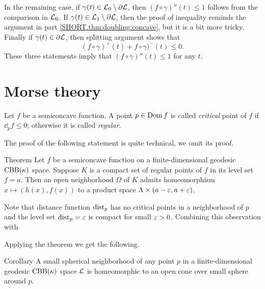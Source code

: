 In the remaining case, if $\gamma(t)\z\in \spc{L}_0\setminus\partial\spc{L}$, then $(f\circ\gamma)''(t)\le 1$ follows from the comparison in $\mathcal{L}_0$.
If $\gamma(t)\in \mathcal{L}_1\setminus\partial\mathcal{L}$, then the proof of inequality reminds the argument in part \ref{SHORT.thm:doubling:concave}, but it is a bit more tricky.
Finally if $\gamma(t)\in\partial\mathcal{L}$, then splitting argument shows that 
\[(f\circ\gamma)^+(t)+f\circ\gamma)^-(t)\le 0.\]
These three statements imply that $(f\circ\gamma)''(t)\le 1$ for any $t$.
\qeds


\section{Morse theory}

Let $f$ be a semiconcave function.
A point $p\in \mathop{\rm Dom}\nolimits f$ is called \emph{critical} point of $f$ if $\dd_pf\le 0$; 
otherwise it is called \emph{regular}.

The proof of the following statement is quite technical, we omit its proof.

\begin{thm}{Theorem}
Let $f$ be a semiconcave function on a finite-dimensional geodesic $\mathrm{CBB}(\kappa)$ space.
Suppose $K$ is a compact set of regular points of $f$ in its level set $f=a$.
Then an open neighborhood $\Omega$ of $K$ admits homeomorphism $x\mapsto (h(x),f(x))$ to a product space $\Lambda\times (a-\varepsilon,a+\varepsilon)$.

\end{thm}

Note that distance function $\mathrm{dist}_p$ has no critical points in a neighborhood of $p$ and the level set $\mathrm{dist}_p=\varepsilon$ is compact for small $\varepsilon>0$.
Combining this observation with 

Applying the theorem we get the following.

\begin{thm}{Corollary}
A small spherical neighborhood of any point $p$ in a finite-dimensional geodesic $\mathrm{CBB}(\kappa)$ space $\mathcal{L}$ is homeomorphic to an open cone over small sphere around $p$.
\end{thm}
